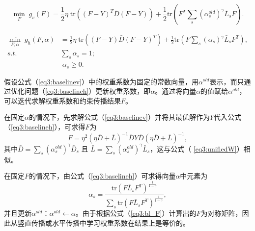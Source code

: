 \begin{equation}
\mathop{\mathrm{min}}_{{F}}\;g_v({F})=\frac{1}{2}\eta\;\mathrm{tr}(({F}-{Y})^T\bar{{D}}({F}-{Y}))+\frac{1}{2}\mathrm{tr}({F}^T \sum_s(\alpha_s^{old})^\gamma\bar{{L}}_s{F}).
\label{eq3:baselinev}
\end{equation}

\begin{equation}
\begin{split}
\mathop{\mathrm{min}}_{{F},{\alpha}}\;g_h({F},{\alpha})&=\frac{1}{2}\eta\;\mathrm{tr}(({F}-{Y})\bar{{D}}({F}-{Y})^T)+\frac{1}{2}\mathrm{tr}({F} \sum_s(\alpha_s)^\gamma\bar{{L}}_s{F}^T), \\
s.t.\quad\;& \sum_s \alpha_s = 1;\\ & \; \alpha_s \ge 0.
\end{split}
\label{eq3:baselineh}
\end{equation}

假设公式（\ref{eq3:baselinev}）中的权重系数为固定的常数向量，用$ {\alpha}^{old} $表示，而只通过优化问题（\ref{eq3:baselineh}）更新权重系数，即$\alpha$。通过将向量$\alpha$的值赋给$ {\alpha}^{old} $，可以迭代求解权重系数和约束传播结果$F$。

在固定$\alpha$的情况下，先求解公式（\ref{eq3:baselinev}）并将其最优解作为$Y$代入公式（\ref{eq3:baselineh}），可求得$F$为
\begin{equation}
{F} = \eta^2(\eta\bar{{D}}+\bar{{L}})^{-1}\bar{{D}} {Y}\bar{{D}}(\eta\bar{{D}}+\bar{{L}})^{-1}, 
\label{eq3:bl_F}
\end{equation}
其中$\bar{{D}} = \sum_s (\alpha_s^{old})^\gamma  \bar{{D}}_s $ 且 $  \bar{{L}} = \sum_s (\alpha_s^{old})^\gamma  \bar{{L}}_s $，这与公式（ \ref{eq3:unifiedW}）相似。

在固定$F$的情况下，由公式（\ref{eq3:baselineh}）可求得向量$\alpha$中元素为
\begin{equation}
\alpha_s = \frac{\mathrm{tr}({F} \bar{{L}}_s{F}^T)^\frac{1}{1-\gamma}}{\sum_s \mathrm{tr}({F} \bar{{L}}_s{F}^T)^\frac{1}{1-\gamma}}, 
\end{equation}
并且更新${\alpha}^{old}$：$ {\alpha}^{old} \leftarrow {\alpha}$。由于根据公式（\ref{eq3:bl_F}）计算出的$F$为对称矩阵，因此从竖直传播或水平传播中学习权重系数在结果上是等价的。

